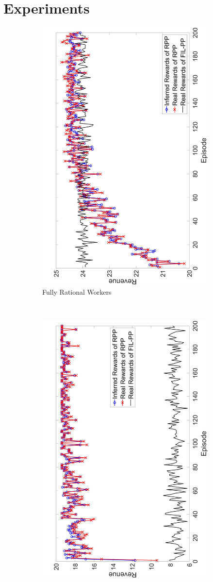 \documentclass{article}
\begin{document}
\section{Experiments}
\vspace{-4mm}
\begin{figure}[htb]
    \centering
    \begin{subfigure}[t]{0.3\textwidth}
        \centering
        \includegraphics[height=\textwidth, angle=-90]{image/1}
        \caption{\label{E1} Fully Rational Workers}
    \end{subfigure}%
    ~
    \begin{subfigure}[t]{0.3\textwidth}
        \centering
        \includegraphics[height=\textwidth, angle=-90]{image/2}

\end{subfigure}
\end{figure}
\end{document}

